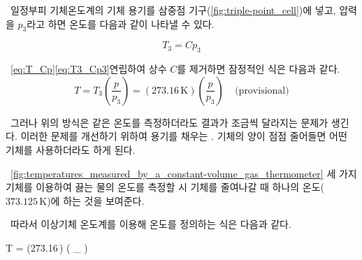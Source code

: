 %
\ 일정부피 기체온도계의 기체 용기를 삼중점 기구(\autoref{fig:triple-point_cell})에 넣고, 압력을 $p_3$라고 하면
온도를 다음과 같이 나타낼 수 있다.

\begin{equation} T_{3} = Cp_{3}
\label{eq:T3_Cp3}\end{equation}

\ \autoref{eq:T_Cp}\와 \autoref{eq:T3_Cp3}\을 연립하여 상수 $C$를 제거하면 잠정적인 식은 다음과 같다. \\
%
\begin{equation} T = T_{3} \left( \frac{p}{p_{3}} \right) = \left( 273.16\,\mathrm{K} \right) \left( \frac{p}{p_{3}} \right) ~~~~~ \text{(provisional)}
\label{eq:provisional_ideal_gas_temperature}\end{equation}

\ 그러나 위의 방식은 같은 온도를 측정하더라도 
결과가 조금씩 달라지는 문제가 생긴다.
이러한 문제를 개선하기 위하여 용기를 채우는 .
기체의 양이 점점 줄어들면 어떤 기체를 사용하더라도 하게 된다.

\temperaturesmeasuredbyaconstantvolumegasthermometer
{}%
\ \autoref{fig:temperatures_measured_by_a_constant-volume_gas_thermometer}\은
세 가지 기체를 이용하여 끓는 물의 온도를 측정할 시
기체를 줄여나갈 때 하나의 온도($373.125\,\mathrm{K}$)에 하는 것을 보여준다.
\clearpage



\ 따라서 이상기체 온도계를 이용해 온도를 정의하는 식은 다음과 같다.

\begin{eqbox} T = (273.16\,) \left( \lim_{} \right)
\label{eq:ideal_gas_temperature} \end{eqbox}

